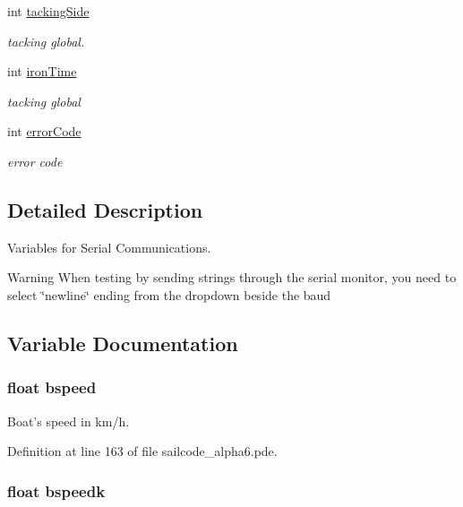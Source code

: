 \begin{DoxyCompactItemize}
int \hyperlink{group__group1_gabdfa4a25e22806c47eebd4c9826ef7a6}{tacking\-Side}
\begin{DoxyCompactList}\small\item\em tacking global. \end{DoxyCompactList}\item 
int \hyperlink{group__group1_ga332365589e9af9d8ec4d1c5663034132}{iron\-Time}
\begin{DoxyCompactList}\small\item\em tacking global \end{DoxyCompactList}\item 
int \hyperlink{group__group1_gab675a39a0c7f0587be9ae6734db7ac80}{error\-Code}
\begin{DoxyCompactList}\small\item\em error code \end{DoxyCompactList}\end{DoxyCompactItemize}


\subsection{\-Detailed \-Description}
\-Variables for \-Serial \-Communications. \begin{DoxyWarning}{\-Warning}
\-When testing by sending strings through the serial monitor, you need to select \char`\"{}newline\char`\"{} ending from the dropdown beside the baud 
\end{DoxyWarning}


\subsection{\-Variable \-Documentation}
\hypertarget{group__group1_ga3c5844d05a57a968ed5686a10e4a5af8}{
\subsubsection[{bspeed}]{\setlength{\rightskip}{0pt plus 5cm}float {\bf bspeed}}}
\label{group__group1_ga3c5844d05a57a968ed5686a10e4a5af8}


\-Boat's speed in km/h. 



\-Definition at line 163 of file sailcode\-\_\-alpha6.\-pde.

\hypertarget{group__group1_ga6ebc5b99dfacc747433709383f3bea8c}{
\subsubsection[{bspeedk}]{\setlength{\rightskip}{0pt plus 5cm}float {\bf bspeedk}}}
\label{group__group1_ga6ebc5b99dfacc747433709383f3bea8c}


